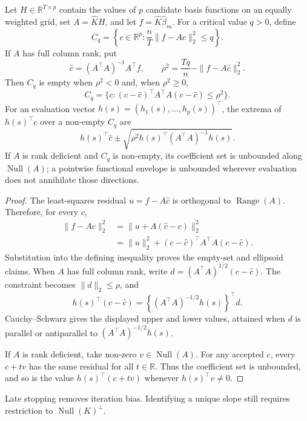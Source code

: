 \begin{proposition}
\label{prop:app-confidence-ellipsoid}
Let $H\in\mathbb R^{T\times p}$ contain the values of $p$ candidate basis
functions on an equally weighted grid, set $A=\widehat KH$, and let
$f=\widehat K\widehat\beta_m$.  For a critical value $q>0$, define
\[
    C_q=\left\{c\in\mathbb R^p:
      \frac nT\|f-Ac\|_2^2\leq q\right\}.
\]
If $A$ has full column rank, put
\[
    \widehat c=(A^\top A)^{-1}A^\top f,
    \qquad
    \rho^2=\frac{Tq}{n}-\|f-A\widehat c\|_2^2.
\]
Then $C_q$ is empty when $\rho^2<0$ and, when $\rho^2\geq0$,
\[
    C_q=\{c:(c-\widehat c)^\top A^\top A(c-\widehat c)
                    \leq\rho^2\}.
\]
For an evaluation vector $h(s)=(h_1(s),\ldots,h_p(s))^\top$, the extrema of
$h(s)^\top c$ over a non-empty $C_q$ are
\[
    h(s)^\top\widehat c
    \mathbin{\pm}
    \sqrt{\rho^2h(s)^\top(A^\top A)^{-1}h(s)}.
\]
If $A$ is rank deficient and $C_q$ is non-empty, its coefficient set is
unbounded along $\operatorname{Null}(A)$; a pointwise functional envelope is
unbounded wherever evaluation does not annihilate those directions.
\end{proposition}

\begin{proof}
The least-squares residual $u=f-A\widehat c$ is orthogonal to
$\operatorname{Range}(A)$.  Therefore, for every $c$,
\begin{align*}
    \|f-Ac\|_2^2
    &=\|u+A(\widehat c-c)\|_2^2 \\
    &=\|u\|_2^2
      +(c-\widehat c)^\top A^\top A(c-\widehat c).
\end{align*}
Substitution into the defining inequality proves the empty-set and ellipsoid
claims.  When $A$ has full column rank, write
$d=(A^\top A)^{1/2}(c-\widehat c)$.  The constraint becomes
$\|d\|_2\leq\rho$, and
\[
 h(s)^\top(c-\widehat c)
 =\left\{(A^\top A)^{-1/2}h(s)\right\}^\top d.
\]
Cauchy--Schwarz gives the displayed upper and lower values, attained when $d$
is parallel or antiparallel to $(A^\top A)^{-1/2}h(s)$.

If $A$ is rank deficient, take non-zero $v\in\operatorname{Null}(A)$.  For
any accepted $c$, every $c+tv$ has the same residual for all $t\in\mathbb R$.
Thus the coefficient set is unbounded, and so is the value
$h(s)^\top(c+tv)$ whenever $h(s)^\top v\neq0$.
\end{proof}

Late stopping removes iteration bias. Identifying a unique slope still
requires restriction to $\operatorname{Null}(K)^\perp$.
